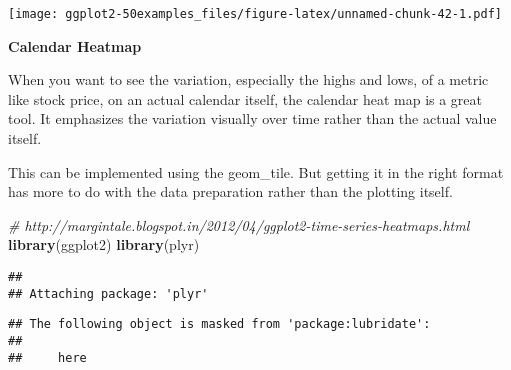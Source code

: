 \documentclass[a4paper]{article}
\newenvironment{Shaded}{\begin{snugshade}}{\end{snugshade}}
\newcommand{\KeywordTok}[1]{\textcolor[rgb]{0.13,0.29,0.53}{\textbf{#1}}}
\newcommand{\CommentTok}[1]{\textcolor[rgb]{0.56,0.35,0.01}{\textit{#1}}}
\newcommand{\NormalTok}[1]{#1}
\begin{document}
\texttt{[image: ggplot2-50examples\_files/figure-latex/unnamed-chunk-42-1.pdf]}

\newpage

\textbf{Calendar Heatmap}

When you want to see the variation, especially the highs and lows, of a
metric like stock price, on an actual calendar itself, the calendar heat
map is a great tool. It emphasizes the variation visually over time
rather than the actual value itself.

This can be implemented using the geom\_tile. But getting it in the
right format has more to do with the data preparation rather than the
plotting itself.

\begin{Shaded}
\begin{Highlighting}[]
\CommentTok{# http://margintale.blogspot.in/2012/04/ggplot2-time-series-heatmaps.html}
\KeywordTok{library}\NormalTok{(ggplot2)}
\KeywordTok{library}\NormalTok{(plyr)}
\end{Highlighting}
\end{Shaded}

\begin{verbatim}
## 
## Attaching package: 'plyr'
\end{verbatim}

\begin{verbatim}
## The following object is masked from 'package:lubridate':
## 
##     here
\end{verbatim}
\end{document}
